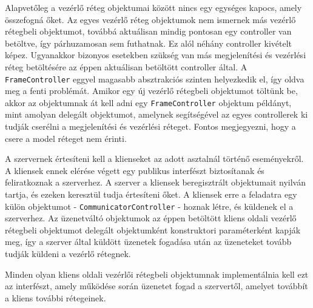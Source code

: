 Alapvetőleg a vezérlő réteg objektumai között nincs egy egységes kapocs, amely összefogná őket. Az egyes vezérlő réteg objektumok nem ismernek más vezérlő rétegbeli objektumot, továbbá aktuálisan mindig pontosan egy controller van betöltve, így párhuzamosan sem futhatnak. Ez alól néhány controller kivételt képez. Ugyanakkor bizonyos esetekben szükség van más megjelenítési és vezérlési réteg betöltésére az éppen aktuálisan betöltött controller által. A \texttt{FrameController} eggyel magasabb absztrakciós szinten helyezkedik el, így oldva meg a fenti problémát. Amikor egy új vezérlő rétegbeli objektumot töltünk be, akkor az objektumnak át kell adni egy \texttt{FrameController} objektum példányt, mint amolyan delegált objektumot, amelynek segítségével az egyes controllerek ki tudják cserélni a megjelenítési és vezérlési réteget. Fontos megjegyezni, hogy a csere a model réteget nem érinti.

A szervernek értesíteni kell a klienseket az adott asztalnál történő eseményekről. A kliensek ennek elérése végett egy publikus interfészt biztosítanak és feliratkoznak a szerverhez. A szerver a kliensek beregisztrált objektumait nyilván tartja, és ezeken keresztül tudja értesíteni őket. A kliensek erre a feladatra egy külön objektumot - \texttt{CommunicatorController} - hoznak létre, és küldenek el a szerverhez. Az üzenetváltó objektumok az éppen betöltött kliens oldali vezérlő rétegbeli objektumot delegált objektumként konstruktori paraméterként kapják meg, így a szerver által küldött üzenetek fogadása után az üzeneteket tovább tudják küldeni a vezérlő rétegnek.

Minden olyan kliens oldali vezérlői rétegbeli objektumnak implementálnia kell ezt az interfészt, amely működése során üzenetet fogad a szervertől, amelyet továbbít a kliens további rétegeinek.

